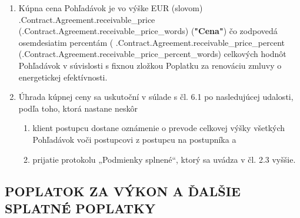 \documentclass[a4paper]{article}
\begin{document}
\begin{enumerate}
\item{
    Kúpna cena Pohľadávok je vo výške EUR (slovom) 
    \iffalse input forfaitingFields.receivable_price value="{{.Contract.Agreement.receivable_price}}" type="number" \fi {{.Contract.Agreement.receivable_price}} (\iffalse input forfaitingFields.receivable_price_words value="{{.Contract.Agreement.receivable_price_words}}" \fi {{.Contract.Agreement.receivable_price_words}})
     (\textbf{"Cena"})  čo zodpovedá osemdesiatim percentám 
    ( \iffalse input forfaitingFields.receivable_price_percent value="{{.Contract.Agreement.receivable_price_percent}}" type="number" \fi {{.Contract.Agreement.receivable_price_percent}} (\iffalse input forfaitingFields.receivable_price_percent_words value="{{.Contract.Agreement.receivable_price_percent_words}}" \fi {{.Contract.Agreement.receivable_price_percent_words}}) 
    celkových hodnôt Pohľadávok v súvislosti s fixnou zložkou Poplatku za renováciu zmluvy o energetickej efektívnosti.}
\item{Úhrada kúpnej ceny sa uskutoční v súlade s čl. 6.1 po nasledujúcej udalosti, podľa toho, ktorá nastane neskôr}

    \begin{enumerate}
        \item {klient postupcu dostane oznámenie o prevode celkovej výšky všetkých Pohľadávok voči postupcovi z postupcu na postupníka a }
        \item {prijatie protokolu „Podmienky splnené“, ktorý sa uvádza v čl. 2.3 vyššie.}
        
    \end{enumerate}
\end{enumerate}

\subsection{POPLATOK ZA VÝKON A ĎALŠIE SPLATNÉ POPLATKY}
\end{document}
